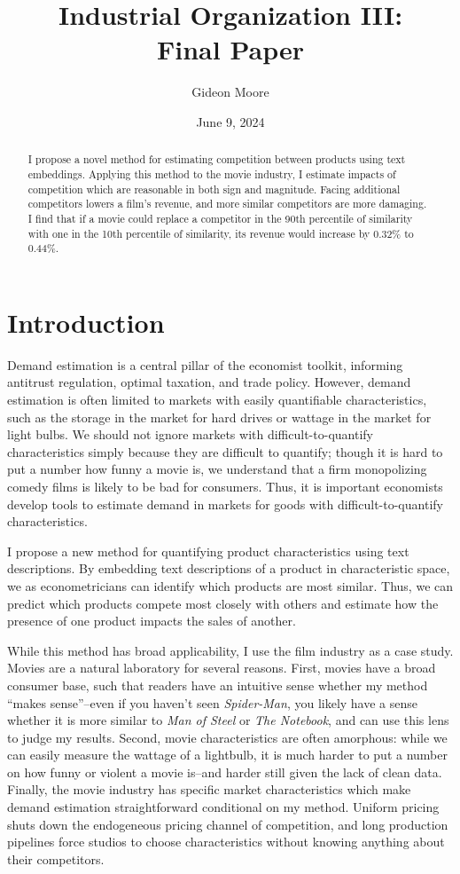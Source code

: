 \documentclass{article}
\author{Gideon Moore}
\title{Industrial Organization III: \\ Final Paper}
\date{June 9, 2024}
\begin{document}
\maketitle 

\begin{abstract}
    I propose a novel method for estimating competition between products using text embeddings. Applying this method to the movie industry, I estimate impacts of competition which are reasonable in both sign and magnitude. Facing additional competitors lowers a film's revenue, and more similar competitors are more damaging. I find that if a movie could replace a competitor in the 90th percentile of similarity with one in the 10th percentile of similarity, its revenue would increase by 0.32\% to 0.44\%.
\end{abstract}

\section{Introduction}

Demand estimation is a central pillar of the economist toolkit, informing antitrust regulation, optimal taxation, and trade policy. However, demand estimation is often limited to markets with easily quantifiable characteristics, such as the storage in the market for hard drives or wattage in the market for light bulbs. We should not ignore markets with difficult-to-quantify characteristics simply because they are difficult to quantify; though it is hard to put a number how funny a movie is, we understand that a firm monopolizing comedy films is likely to be bad for consumers. Thus, it is important economists develop tools to estimate demand in markets for goods with difficult-to-quantify characteristics.

I propose a new method for quantifying product characteristics using text descriptions. By embedding text descriptions of a product in characteristic space, we as econometricians can identify which products are most similar. Thus, we can predict which products compete most closely with others and estimate how the presence of one product impacts the sales of another.

While this method has broad applicability, I use the film industry as a case study. Movies are a natural laboratory for several reasons. First, movies have a broad consumer base, such that readers have an intuitive sense whether my method ``makes sense''--even if you haven't seen \emph{Spider-Man}, you likely have a sense whether it is more similar to \emph{Man of Steel} or \emph{The Notebook}, and can use this lens to judge my results. Second, movie characteristics are often amorphous: while we can easily measure the wattage of a lightbulb, it is much harder to put a number on how funny or violent a movie is--and harder still given the lack of clean data. Finally, the movie industry has specific market characteristics which make demand estimation straightforward conditional on my method. Uniform pricing shuts down the endogeneous pricing channel of competition, and long production pipelines force studios to choose characteristics without knowing anything about their competitors.
\end{document}
